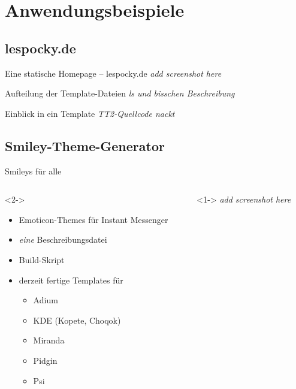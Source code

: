 \documentclass[hyperref={pdfpagelabels=false}]{beamer}
\begin{document}
\section{Anwendungsbeispiele}

\subsection{lespocky.de}

\begin{frame}{Eine statische Homepage -- lespocky.de}
    \emph{add screenshot here}
\end{frame}

\begin{frame}{Aufteilung der Template-Dateien}
    \emph{ls und bisschen Beschreibung}
\end{frame}

\begin{frame}{Einblick in ein Template}
    \emph{TT2-Quellcode nackt}
\end{frame}

\subsection{Smiley-Theme-Generator}

\begin{frame}{Smileys für alle}
    \begin{columns}
        \begin{column}{0.6\textwidth}<2->
            \begin{itemize}
                \item Emoticon-Themes für Instant Messenger
                \item \emph{eine} Beschreibungsdatei
                \item Build-Skript
                \item derzeit fertige Templates für
                    \begin{itemize}
                        \item Adium
                        \item KDE (Kopete, Choqok)
                        \item Miranda
                        \item Pidgin
                        \item Psi
                    \end{itemize}
            \end{itemize}
        \end{column}
        \begin{column}{0.4\textwidth}<1->
            \emph{add screenshot here}
        \end{column}
    \end{columns}
\end{frame}
\end{document}
